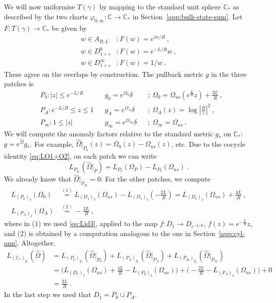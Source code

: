 \documentclass[11pt,a4paper]{article}
\numberwithin{equation}{section}
\begin{document}
We will now uniformise $T(\gamma)$ by mapping to the standard unit sphere $\mathbb{C}_*$ as described by the two charts $\varphi_{0,\infty} : \mathbb{C} \to \mathbb{C}_*$ in Section~\ref{app:bulk-state-sum}. 
Let $F : T(\gamma) \to \mathbb{C}_*$ be given by
\begin{align}
    w \in A_{R,L} &: F(w) = e^{i w/R} \ ,
    \nonumber
    \\
    w \in  D_{1+\varepsilon}^0 &: F(w) = e^{-L/R} w \ ,
    \nonumber
    \\
    w \in  D_{1+\varepsilon}^\infty &: F(w) = 1/w  \ .
\end{align}
These agree on the overlaps by construction. The pullback metric $g$ in the three patches is
\begin{align}
    &P_0 : |z| \le e^{-L/R} &&g_0 = e^{\Omega_0} \delta &&; ~\Omega_0 = \Omega_{us}(e^{\frac{L}{R}}z) + \tfrac{2L}R \ ,
    \nonumber
    \\
    &P_A : e^{-L/R} \le z \le 1  &&g_A = e^{\Omega_A}\delta &&; ~\Omega_A(z) = \log\left|\frac{R}{z}\right|^2 \ ,
    \nonumber
    \\
    &P_\infty : 1 \le |z| &&g_\infty = e^{\Omega_\infty}\delta &&; ~\Omega_\infty = \Omega_{us} \ .
\end{align}
We will compute the anomaly factors relative to the standard metric $g_*$ on $\mathbb{C}_*$: $g = e^{\hat\Omega} g_*$. For example, $\hat\Omega|_{P_0}(z) = \Omega_0(z) - \Omega_{us}(z)$, etc. Due to the cocycle identity \eqref{eq:LO1+O2}, on each patch we can write
\begin{equation}
    L_{P_{g_*}}(\hat\Omega|_P) 
=    
    L_{P_\delta}(\Omega_P) - L_{P_\delta}(\Omega_{us})\ .
\end{equation}
We already know that $\hat\Omega|_{P_\infty}=0$. For the other patches, we compute
\begin{align}
    L_{(P_0)_{\delta}}(\Omega_0)
    &\overset{(1)}= L_{(D_1)_\delta}(\Omega_{us}) - L_{(D_1)_\delta}(-\tfrac{2L}R)  
    = L_{(D_1)_\delta}(\Omega_{us}) + \tfrac{4L}R \ ,
\nonumber
\\
    L_{(P_A)_{\delta}}(\Omega_A)
    &\overset{(2)}= -\tfrac{2L}R  \ ,
\end{align}
where in (1) we used \eqref{eq:Lid3}, applied to the map $f : D_1 \to D_{e^{-L/R}}$, $f(z) = e^{-\frac{L}{R}} z$, and (2) is obtained by a computation analogous to the one in Section~\ref{app:cyl-ann}.
Altogether,
\begin{align}\label{eq:torus-anomaly-comp}
    L_{(\mathbb{C}_*)_{g_*}}(\hat\Omega)
    &=
    L_{(P_0)_{g_*}}(\hat\Omega|_{P_0})
    +
    L_{(P_A)_{g_*}}(\hat\Omega|_{P_A})
    +
    L_{(P_\infty)_{g_*}}(\hat\Omega|_{P_\infty})
    \nonumber
    \\
    &= \Big(L_{(D_1)_\delta}(\Omega_{us}) + \tfrac{4L}R  - L_{(P_0)_\delta}(\Omega_{us}) \Big)
    + \Big(-\tfrac{2L}R  - L_{(P_A)_\delta}(\Omega_{us})  \Big)
    + 0
        \nonumber
    \\
    &= \frac{2L}R \ .
\end{align}
In the last step we used that $D_1 = P_0 \cup P_A$.
\end{document}
